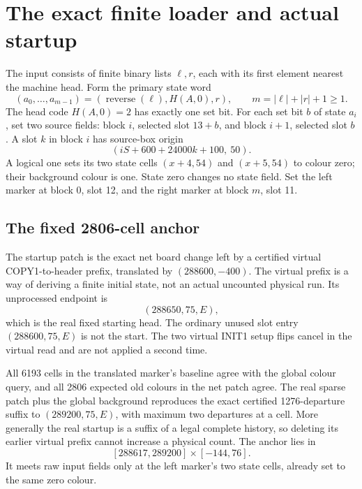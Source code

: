 \documentclass[11pt,letterpaper]{article}
\theoremstyle{definition}\newtheorem{definition}[theorem]{Definition}
\theoremstyle{remark}\newtheorem{remark}[theorem]{Remark}
\begin{document}
\section{The exact finite loader and actual startup}\label{ptr:la:sec:loader}
The input consists of finite binary lists $\ell,r$, each with its first element nearest the machine head. Form the primary state word
\[
 (a_0,\ldots,a_{m-1})=(\operatorname{reverse}(\ell),H(A,0),r),
 \qquad m=|\ell|+|r|+1\ge1.
\]
The head code $H(A,0)=2$ has exactly one set bit. For each set bit $b$ of state $a_i$, set two source fields: block $i$, selected slot $13+b$, and block $i+1$, selected slot $b$. A slot $k$ in block $i$ has source-box origin
\[
 (iS+600+24000k+100,\ 50).
\]
A logical one sets its two state cells $(x+4,54)$ and $(x+5,54)$ to colour zero; their background colour is one. State zero changes no state field. Set the left marker at block 0, slot 12, and the right marker at block $m$, slot 11.

\subsection{The fixed 2806-cell anchor}
The startup patch is the exact net board change left by a certified virtual COPY1-to-header prefix, translated by $(288600,-400)$. The virtual prefix is a way of deriving a finite initial state, not an actual uncounted physical run. Its unprocessed endpoint is
\[
 (288650,75,E),
\]
which is the real fixed starting head. The ordinary unused slot entry $(288600,75,E)$ is not the start. The two virtual INIT1 setup flips cancel in the virtual read and are not applied a second time.

All 6193 cells in the translated marker's baseline agree with the global colour query, and all 2806 expected old colours in the net patch agree. The real sparse patch plus the global background reproduces the exact certified 1276-departure suffix to $(289200,75,E)$, with maximum two departures at a cell. More generally the real startup is a suffix of a legal complete history, so deleting its earlier virtual prefix cannot increase a physical count. The anchor lies in
\[
 [288617,289200]\times[-144,76].
\]
It meets raw input fields only at the left marker's two state cells, already set to the same zero colour.
\end{document}
